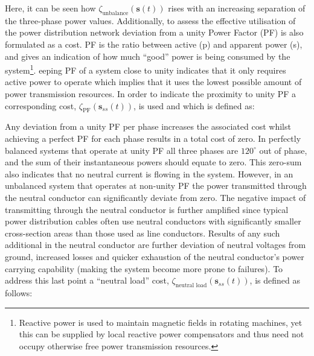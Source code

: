 


Here, it can be seen how $\zeta_\text{unbalance}(\textbf{s}(t))$ rises with an increasing separation of the three-phase power values.
Additionally, to assess the effective utilisation of the power distribution network deviation from a unity Power Factor (PF) is also formulated as a cost.
PF is the ratio between active (p) and apparent power (s), and gives an indication of how much ``good'' power is being consumed by the system\footnote{Reactive power is used to maintain magnetic fields in rotating machines, yet this can be supplied by local reactive power compensators and thus need not occupy otherwise free power transmission resources.}.
eeping PF of a system close to unity indicates that it only requires active power to operate which implies that it uses the lowest possible amount of power transmission resources.
In order to indicate the proximity to unity PF a corresponding cost, $\zeta_\text{PF}(\textbf{s}_{ss}(t))$, is used and which is defined as:




Any deviation from a unity PF per phase increases the associated cost whilst achieving a perfect PF for each phase results in a total cost of zero.
In perfectly balanced systems that operate at unity PF all three phases are $120^\circ$ out of phase, and the sum of their instantaneous powers should equate to zero.
This zero-sum also indicates that no neutral current is flowing in the system.
However, in an unbalanced system that operates at non-unity PF the power transmitted through the neutral conductor can significantly deviate from zero.
The negative impact of transmitting  through the neutral conductor is further amplified since typical power distribution cables often use neutral conductors with significantly smaller cross-section areas than those used as line conductors.
Results of any such additional  in the neutral conductor are further deviation of neutral voltages from ground, increased losses and quicker exhaustion of the neutral conductor's power carrying capability (making the system become more prone to failures).
To address this last point a ``neutral load'' cost, $\zeta_\text{neutral load}(\textbf{s}_{ss}(t))$, is defined as follows:

